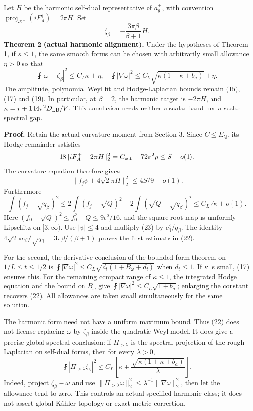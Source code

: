 \documentclass[
  10pt,
]{article}
\begin{document}
Let \(H\) be the harmonic self-dual representative of \(a_g^+\), with
convention \(\operatorname{proj}_{\mathcal H^+}(iF_A^+)=2\pi H\). Set \[
\zeta_\beta=-\frac{3\pi\beta}{\beta+1}H.
\] \textbf{Theorem 2 (actual harmonic alignment).} Under the hypotheses
of Theorem 1, if \(\kappa\le1\), the same smooth forms can be chosen
with arbitrarily small allowance \(\eta>0\) so that \[
\fint|\omega-\zeta_\beta|^2\le C_L\kappa+\eta,
\quad
\fint|\nabla\omega|^2
\le C_L\sqrt{\kappa(1+\kappa+b_a)}+\eta.
\tag{22}
\] The amplitude, polynomial Weyl fit and Hodge-Laplacian bounds remain
(15), (17) and (19). In particular, at \(\beta=2\), the harmonic target
is \(-2\pi H\), and \(\kappa=r+144\pi^2D_{\rm LB}/V\). This conclusion
needs neither a scalar band nor a scalar spectral gap.

\textbf{Proof.} Retain the actual curvature moment from Section 3. Since
\(C\le E_Q\), its Hodge remainder satisfies \[
18\|iF_A^+-2\pi H\|_2^2
=C_{\rm act}-72\pi^2p\le S+o(1).
\] The curvature equation therefore gives \[
\|f_j\psi+4\sqrt2\pi H\|_2^2\le4S/9+o(1).
\tag{23}
\] Furthermore \[
\int(f_j-\sqrt{q_\beta})^2
\le2\int(f_j-\sqrt Q)^2
+2\int(\sqrt Q-\sqrt{q_\beta})^2
\le C_LV\kappa+o(1).
\] Here \((f_0-\sqrt Q)^2\le f_0^2-Q\le9e^2/16\), and the square-root
map is uniformly Lipschitz on \([3,\infty)\). Use \(|\psi|\le4\) and
multiply (23) by \(c_\beta^2/q_\beta\). The identity
\(4\sqrt2\pi c_\beta/\sqrt{q_\beta} =3\pi\beta/(\beta+1)\) proves the
first estimate in (22).

For the second, the derivative conclusion of the bounded-form theorem on
\(1/L\le t\le1/2\) is
\(\fint|\nabla\omega|^2\le C_L\sqrt{d_t(1+B_\omega+d_t)}\) when
\(d_t\le1\). If \(\kappa\) is small, (17) ensures this. For the
remaining compact range of \(\kappa\le1\), the integrated Hodge equation
and the bound on \(B_\omega\) give
\(\fint|\nabla\omega|^2\le C_L\sqrt{1+b_a}\); enlarging the constant
recovers (22). All allowances are taken small simultaneously for the
same solution.

The harmonic form need not have a uniform maximum bound. Thus (22) does
not license replacing \(\omega\) by \(\zeta_\beta\) inside the quadratic
Weyl model. It does give a precise global spectral conclusion: if
\(\Pi_{>\lambda}\) is the spectral projection of the rough Laplacian on
self-dual forms, then for every \(\lambda>0\), \[
\fint|\Pi_{>\lambda}\zeta_\beta|^2
\le C_L\left[\kappa+
\frac{\sqrt{\kappa(1+\kappa+b_a)}}{\lambda}\right].
\tag{24}
\] Indeed, project \(\zeta_\beta-\omega\) and use
\(\|\Pi_{>\lambda}\omega\|_2^2 \le\lambda^{-1}\|\nabla\omega\|_2^2\),
then let the allowance tend to zero. This controls an actual specified
harmonic class; it does not assert global Kähler topology or exact
metric correction.
\end{document}
